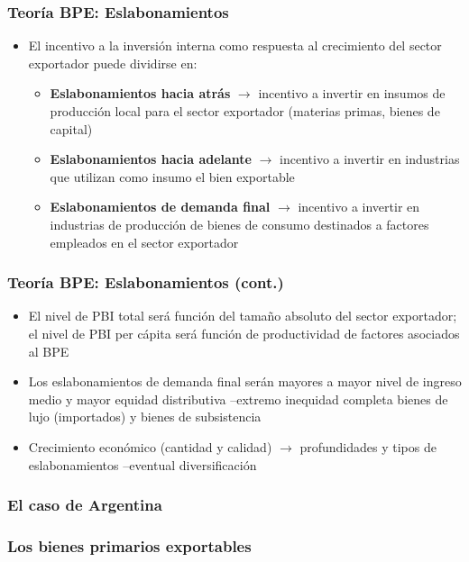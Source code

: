 \documentclass[14pt,aspectratio=169]{beamer}
\begin{document}
\begin{frame}\frametitle{Teoría BPE: Eslabonamientos}
  \begin{itemize}
  \item El incentivo a la inversión interna como respuesta al
    crecimiento del sector exportador puede dividirse en:
    \begin{itemize}\itemsep 10pt \medskip
      \item \textbf{Eslabonamientos hacia atrás} $\longrightarrow$
        incentivo a invertir en insumos de producción local para el
        sector exportador (materias primas, bienes de capital)
        \item \textbf{Eslabonamientos hacia adelante}
          $\longrightarrow$ incentivo a invertir en industrias que
          utilizan como insumo el bien exportable
          \item \textbf{Eslabonamientos de demanda final}
            $\longrightarrow$ incentivo a invertir en industrias de
            producción de bienes de consumo destinados a factores
            empleados en el sector exportador
          \end{itemize}
\end{itemize}
        \end{frame}


\begin{frame}\frametitle{Teoría BPE: Eslabonamientos (cont.)}
  \begin{itemize}
  \item El nivel de PBI total será función del tamaño absoluto del sector
    exportador; el nivel de PBI per cápita será función de
    productividad de factores asociados al BPE
    \item Los eslabonamientos de demanda final serán mayores a mayor
      nivel de ingreso medio y mayor equidad distributiva --extremo
      inequidad completa bienes de lujo (importados) y bienes de
      subsistencia
      \item Crecimiento económico (cantidad y calidad)
        $\longrightarrow$ profundidades y tipos de eslabonamientos
        --eventual diversificación 
          \end{itemize}
        \end{frame}

        
\subsubsection{El caso de Argentina}

\subsubsection{Los bienes primarios exportables}
\end{document}
